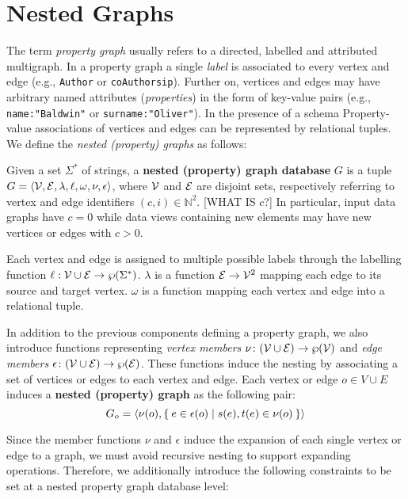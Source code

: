 
\section{Nested Graphs}
\label{sec:model}
The term \textit{property graph}  usually refers to a directed, labelled and attributed multigraph. 
In a property graph a single \textit{label}  is associated to every vertex and edge (e.g., \texttt{Author} or \texttt{coAuthorsip}). Further on, vertices and edges may have arbitrary named attributes (\textit{properties}) in the form of key-value pairs (e.g., \texttt{name:"Baldwin"} or \texttt{surname:"Oliver"}). In the presence of a schema Property-value associations of vertices and edges can be represented by relational tuples. We define the\textit{ nested (property) graphs} as follows:

\begin{definition}
Given a set $\Sigma^*$ of strings,
	a \textbf{nested (property) graph database} $G$ is a tuple $G=\Braket{\mathcal{V}, \mathcal{E}, \lambda,\ell,\omega,\nu,\epsilon}$, where $\mathcal{V}$ and $\mathcal{E}$ are disjoint sets, respectively referring to vertex and edge identifiers $(c,i)\in\mathbb{N}^2$. [WHAT IS $c$?]  In particular, input data graphs have $c=0$ while data views containing new elements may have new vertices or edges with $c>0$. 
	
	Each vertex and edge is assigned to multiple possible labels through the labelling function $\ell:\mathcal{V}\cup \mathcal{E}\to \wp(\Sigma^*)$. $\lambda$ is a function $\mathcal{E}\to \mathcal{V}^2$ mapping each edge to its source and target vertex. $\omega$ is a function mapping each vertex and edge into a relational tuple.
	
	In addition to the previous components defining a property graph, we also introduce functions representing \textit{vertex members} $\nu\colon (\mathcal{V}\cup \mathcal{E})\to\wp(\mathcal{V})$ and \textit{edge members} $\epsilon\colon(\mathcal{V}\cup \mathcal{E})\to \wp(\mathcal{E})$. These functions induce the nesting by associating a set of vertices or edges to each vertex and edge. Each vertex or edge $o\in V\cup E$ induces a \textbf{nested (property) graph} as the following pair:
	\[G_o=\Braket{\nu(o),\Set{e\in\epsilon(o)|s(e),t(e)\in\nu(o)}}\]
\end{definition}


Since the member functions $\nu$ and $\epsilon$ induce the expansion of each single vertex or edge to a graph, we must avoid recursive nesting to support expanding operations.
Therefore, we additionally introduce the following constraints to be set at a nested property graph database level:

